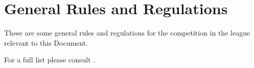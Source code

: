 \chapter{General Rules and Regulations}\label{chap:rules}

These are some general rules and regulations for the competition in the \RoboCup\AtHome{} league relevant to this Document.

For a full list please consult \Rulebook.

%

%












%

